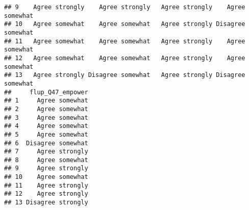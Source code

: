 \documentclass[]{article}
\begin{document}
\begin{verbatim}
## 9    Agree strongly    Agree strongly   Agree strongly    Agree somewhat
## 10   Agree somewhat    Agree somewhat   Agree strongly Disagree somewhat
## 11   Agree somewhat    Agree somewhat   Agree strongly    Agree somewhat
## 12   Agree somewhat    Agree somewhat   Agree strongly    Agree somewhat
## 13   Agree strongly Disagree somewhat   Agree strongly Disagree somewhat
##     flup_Q47_empower
## 1     Agree somewhat
## 2     Agree somewhat
## 3     Agree somewhat
## 4     Agree somewhat
## 5     Agree somewhat
## 6  Disagree somewhat
## 7     Agree strongly
## 8     Agree somewhat
## 9     Agree strongly
## 10    Agree somewhat
## 11    Agree strongly
## 12    Agree strongly
## 13 Disagree strongly
\end{verbatim}
\end{document}
